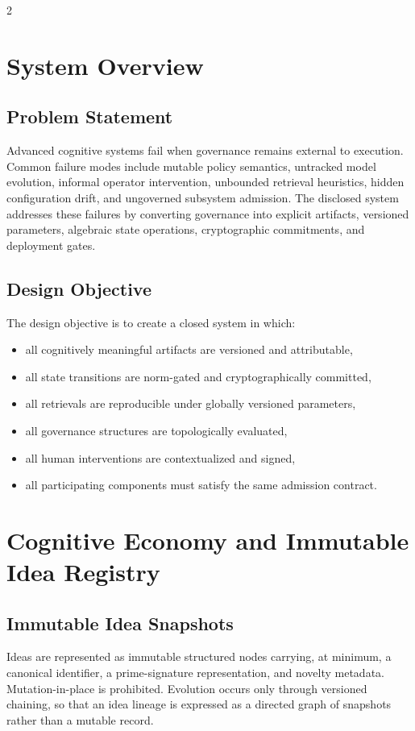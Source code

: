 \documentclass[11pt]{article}
\begin{document}
\newpage
 \begin{multicols}{2}
\begin{singlespace}
\tableofcontents
\end{singlespace}
\end{multicols}
 \newpage

\section{System Overview}
\subsection{Problem Statement}
Advanced cognitive systems fail when governance remains external to execution. Common failure modes include mutable policy semantics, untracked model evolution, informal operator intervention, unbounded retrieval heuristics, hidden configuration drift, and ungoverned subsystem admission. The disclosed system addresses these failures by converting governance into explicit artifacts, versioned parameters, algebraic state operations, cryptographic commitments, and deployment gates.

\subsection{Design Objective}
The design objective is to create a closed system in which:
\begin{itemize}[leftmargin=1cm]
  \item all cognitively meaningful artifacts are versioned and attributable,
  \item all state transitions are norm-gated and cryptographically committed,
  \item all retrievals are reproducible under globally versioned parameters,
  \item all governance structures are topologically evaluated,
  \item all human interventions are contextualized and signed,
  \item all participating components must satisfy the same admission contract.
\end{itemize}

\section{Cognitive Economy and Immutable Idea Registry}
\subsection{Immutable Idea Snapshots}
Ideas are represented as immutable structured nodes carrying, at minimum, a canonical identifier, a prime-signature representation, and novelty metadata. Mutation-in-place is prohibited. Evolution occurs only through versioned chaining, so that an idea lineage is expressed as a directed graph of snapshots rather than a mutable record.
\end{document}
